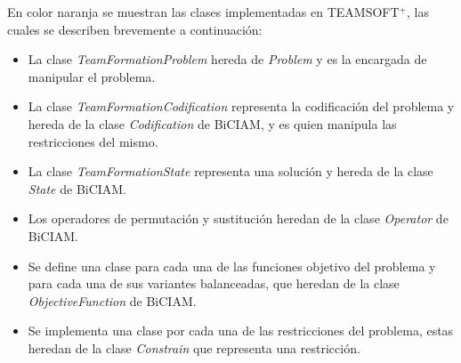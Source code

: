 En color naranja se muestran las clases implementadas en TEAMSOFT$^+$, las cuales se describen brevemente a continuación:
\begin{itemize}
	\item La clase \textit{TeamFormationProblem} hereda de \textit{Problem} y es la encargada de manipular el problema.
	\item La clase \textit{TeamFormationCodification} representa la codificación del problema y hereda de la clase \textit{Codification} de BiCIAM, y es quien manipula las restricciones del mismo.
	\item La clase \textit{TeamFormationState} representa una solución y hereda de la clase \textit{State} de BiCIAM.
	\item Los operadores de permutación y sustitución heredan de la clase \textit{Operator} de BiCIAM.
	\item Se define una clase para cada una de las funciones objetivo del problema y para cada una de sus variantes balanceadas, que heredan de la clase \textit{ObjectiveFunction} de BiCIAM.
	\item Se implementa una clase por cada una de las restricciones del problema, estas heredan de la clase \textit{Constrain} que representa una restricción.
\end{itemize}

